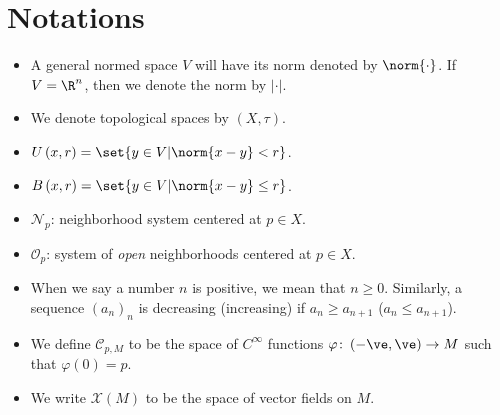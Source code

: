 \documentclass[10pt]{mypackage}
\begin{document}
\section{Notations}%
\begin{itemize}
  \item A general normed space $V$ will have its norm denoted by $\norm{\cdot}$. If $V = \R^{n}$, then we denote the norm by $ \left\vert \cdot \right\vert $.
  \item We denote topological spaces by $\left( X,\tau \right)$.
  \item $ U\left( x,r \right) = \set{y\in V | \norm{x-y} < r}$.
  \item $ B\left( x,r \right) = \set{y\in V | \norm{x-y} \leq r}$.
  \item $ \mathcal{N}_p $: neighborhood system centered at $p\in X$.
  \item $ \mathcal{O}_p $: system of \textit{open} neighborhoods centered at $p\in X$.
  \item When we say a number $n$ is positive, we mean that $n\geq 0$. Similarly, a sequence $\left( a_n \right)_n$ is decreasing (increasing) if $a_n\geq a_{n+1}$ ($a_n\leq a_{n+1}$).
  \item We define $\mathcal{C}_{p,M}$ to be the space of $C^{\infty}$ functions $\varphi\colon \left( -\ve,\ve \right)\rightarrow M$ such that $\varphi(0) = p$.
  \item We write $\mathcal{X}\left( M \right)$ to be the space of vector fields on $M$.
\end{itemize}
\end{document}
